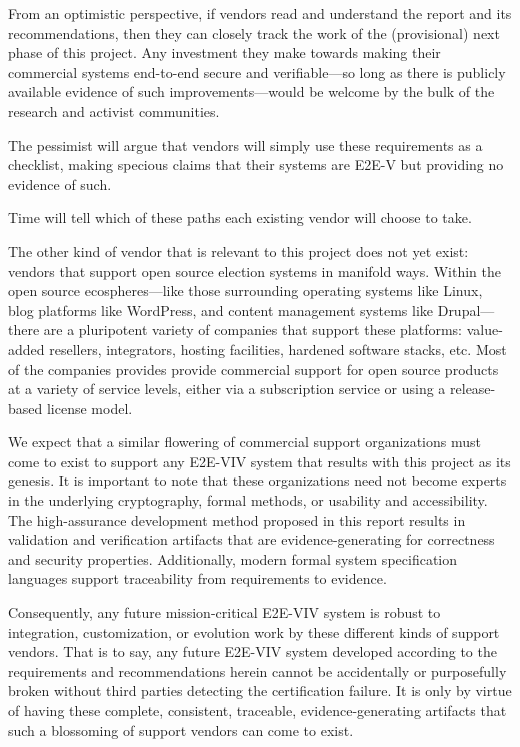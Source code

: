 From an optimistic perspective, if vendors read and understand the
report and its recommendations, then they can closely track the work
of the (provisional) next phase of this project. Any investment they
make towards making their commercial systems end-to-end secure and
verifiable---so long as there is publicly available evidence of such
improvements---would be welcome by the bulk of the research and
activist communities.

The pessimist will argue that vendors will simply use these
requirements as a checklist, making specious claims that their systems
are E2E-V but providing no evidence of such.

Time will tell which of these paths each existing vendor will choose
to take.

The other kind of vendor that is relevant to this project does not yet
exist: vendors that support open source election systems in manifold
ways. Within the open source ecospheres---like those surrounding
operating systems like Linux, blog platforms like WordPress, and
content management systems like Drupal---there are a pluripotent
variety of companies that support these platforms: value-added
resellers, integrators, hosting facilities, hardened software stacks,
etc. Most of the companies provides provide commercial support for
open source products at a variety of service levels, either via a
subscription service or using a release-based license model.

We expect that a similar flowering of commercial support organizations
must come to exist to support any E2E-VIV system that results with
this project as its genesis. It is important to note that these
organizations need not become experts in the underlying cryptography,
formal methods, or usability and accessibility. The high-assurance
development method proposed in this report results in validation and
verification artifacts that are evidence-generating for correctness
and security properties.  Additionally, modern formal system
specification languages support traceability from requirements to
evidence. 

Consequently, any future mission-critical E2E-VIV system is robust to
integration, customization, or evolution work by these different kinds
of support vendors. That is to say, any future E2E-VIV system
developed according to the requirements and recommendations herein
cannot be accidentally or purposefully broken without third parties
detecting the certification failure. It is only by virtue of having
these complete, consistent, traceable, evidence-generating artifacts
that such a blossoming of support vendors can come to exist.

